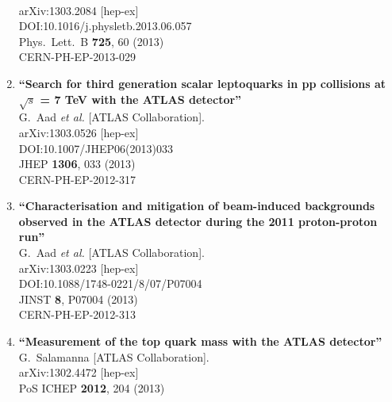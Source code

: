 \documentclass{article}
\begin{document}
\begin{enumerate}
  \\{}arXiv:1303.2084 [hep-ex]
  \\{}DOI:10.1016/j.physletb.2013.06.057
  \\{}Phys.\ Lett.\ B {\bf 725}, 60 (2013)
  \\{}CERN-PH-EP-2013-029
\item%
{\bf ``Search for third generation scalar leptoquarks in pp collisions at $\sqrt{s}$ = 7 TeV with the ATLAS detector''}
  \\{}G.~Aad {\it et al.} [ATLAS Collaboration].
  \\{}arXiv:1303.0526 [hep-ex]
  \\{}DOI:10.1007/JHEP06(2013)033
  \\{}JHEP {\bf 1306}, 033 (2013)
  \\{}CERN-PH-EP-2012-317
\item%
{\bf ``Characterisation and mitigation of beam-induced backgrounds observed in the ATLAS detector during the 2011 proton-proton run''}
  \\{}G.~Aad {\it et al.} [ATLAS Collaboration].
  \\{}arXiv:1303.0223 [hep-ex]
  \\{}DOI:10.1088/1748-0221/8/07/P07004
  \\{}JINST {\bf 8}, P07004 (2013)
  \\{}CERN-PH-EP-2012-313
\item%
{\bf ``Measurement of the top quark mass with the ATLAS detector''}
  \\{}G.~Salamanna [ATLAS Collaboration].
  \\{}arXiv:1302.4472 [hep-ex]
  \\{}PoS ICHEP {\bf 2012}, 204 (2013)


\end{enumerate}
\end{document}
